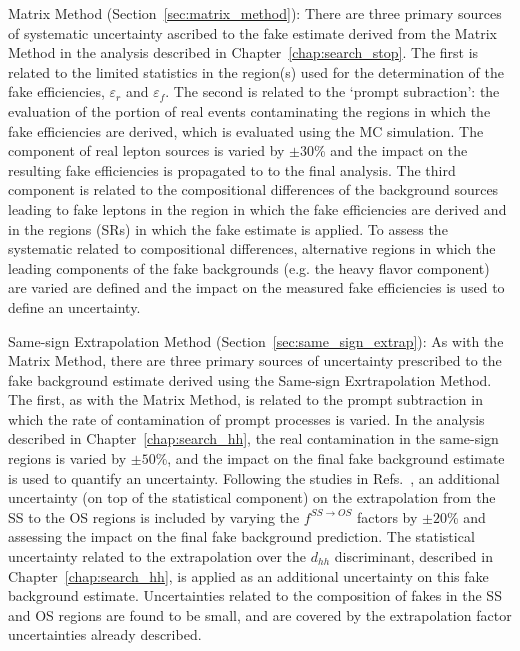 \begin{description}
    \item{Matrix Method (Section~\ref{sec:matrix_method}):} There are three primary sources of systematic
        uncertainty ascribed to the fake estimate derived from the Matrix Method in the analysis described
        in Chapter~\ref{chap:search_stop}.
        The first is related to the limited statistics in the region(s) used for the determination of the
        fake efficiencies, $\varepsilon_r$ and $\varepsilon_f$.
        The second is related to the `prompt subraction': the evaluation of the portion of real events contaminating the
        regions in which the fake efficiencies are derived, which is evaluated using the MC simulation.       
        The component of real lepton sources is varied by $\pm 30$\% and the impact on the resulting
        fake efficiencies is propagated to to the final analysis. 
        The third component is related to the compositional differences of the background sources leading
        to fake leptons in the region in which the fake efficiencies are derived and in the regions (SRs)
        in which the fake estimate is applied.
        To assess the systematic related to compositional differences, alternative regions in which the leading
        components of the fake backgrounds (e.g. the heavy flavor component) are varied are defined and the impact on the measured fake efficiencies
        is used to define an uncertainty.
    \item{Same-sign Extrapolation Method (Section~\ref{sec:same_sign_extrap}):} As with the Matrix Method,
        there are three primary sources of uncertainty prescribed to the fake background estimate derived using
        the Same-sign Exrtrapolation Method. The first, as with the Matrix Method, is related to the prompt subtraction
        in which the rate of contamination of prompt processes is varied.
        In the analysis described in Chapter~\ref{chap:search_hh}, the real contamination in the same-sign
        regions is varied by $\pm 50$\%, and the impact on the final fake background estimate is used to quantify
        an uncertainty.
        Following the studies in Refs.~\cite{TOPQ-2015-09,TOPQ-2017-05}, an additional uncertainty (on top of the statistical component) on the
        extrapolation from the SS to the OS regions is included by varying the $f^{SS \rightarrow OS}$ factors
        by $\pm 20$\% and assessing the impact on the final fake background prediction.
        The statistical uncertainty related to the extrapolation over the $d_{hh}$ discriminant,
        described in Chapter~\ref{chap:search_hh}, is applied as an additional uncertainty on this fake background estimate.
        Uncertainties related to the composition of fakes in the SS and OS regions are found to be small,
        and are covered by the extrapolation factor uncertainties already described.
\end{description}




